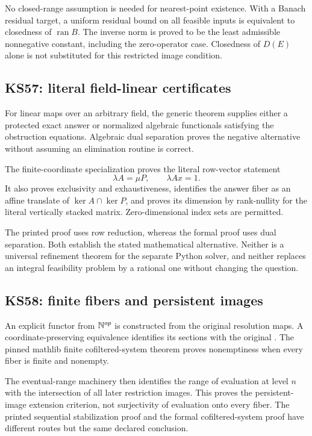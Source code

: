 \documentclass[11pt]{article}
\begin{document}
No closed-range assumption is needed for nearest-point existence. With a Banach residual target, a uniform residual bound on all feasible inputs is equivalent to closedness of \(\operatorname{ran}B\). The inverse norm is proved to be the least admissible nonnegative constant, including the zero-operator case. Closedness of \(D(E)\) alone is not substituted for this restricted image condition.

\subsection{KS57: literal field-linear certificates}
For linear maps over an arbitrary field, the generic theorem supplies either a protected exact answer or normalized algebraic functionals satisfying the obstruction equations. Algebraic dual separation proves the negative alternative without assuming an elimination routine is correct.

The finite-coordinate specialization proves the literal row-vector statement
\[
 \lambda A=\mu P,\qquad \lambda Ax=1.
\]
It also proves exclusivity and exhaustiveness, identifies the answer fiber as an affine translate of \(\ker A\cap\ker P\), and proves its dimension by rank-nullity for the literal vertically stacked matrix. Zero-dimensional index sets are permitted.

The printed proof uses row reduction, whereas the formal proof uses dual separation. Both establish the stated mathematical alternative. Neither is a universal refinement theorem for the separate Python solver, and neither replaces an integral feasibility problem by a rational one without changing the question.

\subsection{KS58: finite fibers and persistent images}
An explicit functor from \(\mathbb N^{op}\) is constructed from the original resolution maps. A coordinate-preserving equivalence identifies its sections with the original . The pinned mathlib finite cofiltered-system theorem proves nonemptiness when every fiber is finite and nonempty.

The eventual-range machinery then identifies the range of evaluation at level \(n\) with the intersection of all later restriction images. This proves the persistent-image extension criterion, not surjectivity of evaluation onto every fiber. The printed sequential stabilization proof and the formal cofiltered-system proof have different routes but the same declared conclusion.
\end{document}

